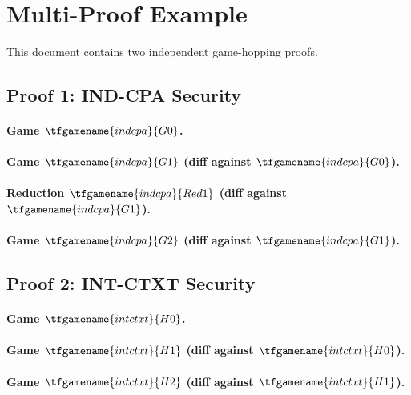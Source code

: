 \documentclass{article}
\begin{document}
\section*{Multi-Proof Example}

This document contains two independent game-hopping proofs.

\subsection*{Proof 1: IND-CPA Security}

\paragraph{Game $\tfgamename{indcpa}{G0}$.}

\paragraph{Game $\tfgamename{indcpa}{G1}$ (diff against $\tfgamename{indcpa}{G0}$).}

\paragraph{Reduction $\tfgamename{indcpa}{Red1}$ (diff against $\tfgamename{indcpa}{G1}$).}

\paragraph{Game $\tfgamename{indcpa}{G2}$ (diff against $\tfgamename{indcpa}{G1}$).}

\subsection*{Proof 2: INT-CTXT Security}

\paragraph{Game $\tfgamename{intctxt}{H0}$.}

\paragraph{Game $\tfgamename{intctxt}{H1}$ (diff against $\tfgamename{intctxt}{H0}$).}

\paragraph{Game $\tfgamename{intctxt}{H2}$ (diff against $\tfgamename{intctxt}{H1}$).}
\end{document}
